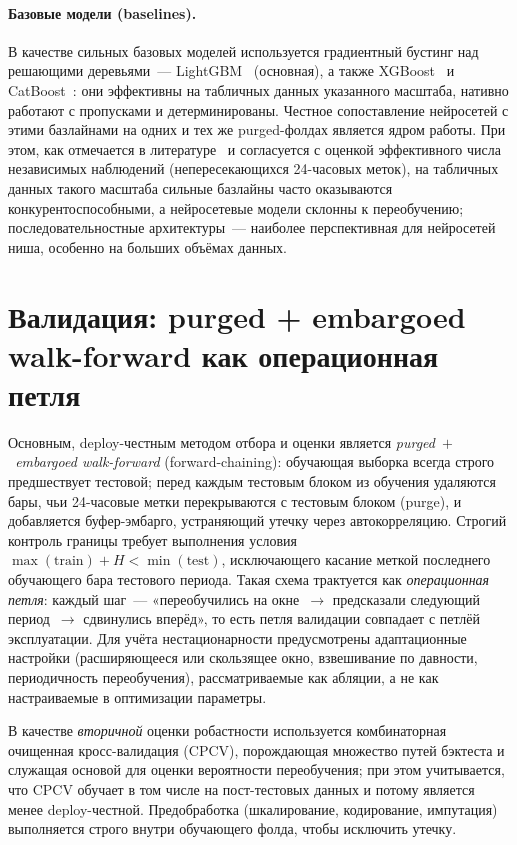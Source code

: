 \documentclass[12pt,a4paper]{report}
\begin{document}
\paragraph{Базовые модели (baselines).} В качестве сильных базовых моделей
используется градиентный бустинг над решающими деревьями~--- LightGBM~\cite{ke2017}
(основная), а также XGBoost~\cite{chen2016} и CatBoost~\cite{prokhorenkova2018}: они
эффективны на табличных данных указанного масштаба, нативно работают с пропусками и
детерминированы. Честное сопоставление нейросетей с этими базлайнами на одних и тех
же purged-фолдах является ядром работы. При этом, как отмечается в
литературе~\cite{ji2019, wu2024} и согласуется с оценкой эффективного числа
независимых наблюдений (непересекающихся 24-часовых меток), на табличных данных
такого масштаба сильные базлайны часто оказываются конкурентоспособными, а
нейросетевые модели склонны к переобучению; последовательностные архитектуры~---
наиболее перспективная для нейросетей ниша, особенно на больших объёмах данных.

\section{Валидация: purged + embargoed walk-forward как операционная петля}

Основным, deploy-честным методом отбора и оценки является \emph{purged~$+$~embargoed
walk-forward} (forward-chaining): обучающая выборка всегда строго предшествует
тестовой; перед каждым тестовым блоком из обучения удаляются бары, чьи 24-часовые
метки перекрываются с тестовым блоком (purge), и добавляется буфер-эмбарго,
устраняющий утечку через автокорреляцию. Строгий контроль границы требует
выполнения условия $\max(\text{train}) + H < \min(\text{test})$, исключающего
касание меткой последнего обучающего бара тестового периода. Такая схема трактуется
как \emph{операционная петля}: каждый шаг~--- «переобучились на окне~$\to$
предсказали следующий период~$\to$ сдвинулись вперёд», то есть петля валидации
совпадает с петлёй эксплуатации. Для учёта нестационарности предусмотрены
адаптационные настройки (расширяющееся или скользящее окно, взвешивание по
давности, периодичность переобучения), рассматриваемые как абляции, а не как
настраиваемые в оптимизации параметры.

В качестве \emph{вторичной} оценки робастности используется комбинаторная очищенная
кросс-валидация (CPCV), порождающая множество путей бэктеста и служащая основой для
оценки вероятности переобучения; при этом учитывается, что CPCV обучает в том числе
на пост-тестовых данных и потому является менее deploy-честной. Предобработка
(шкалирование, кодирование, импутация) выполняется строго внутри обучающего фолда,
чтобы исключить утечку.
\end{document}

